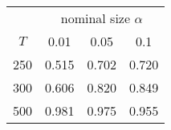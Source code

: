% 
\begin{tabular}{cccc}
  \hline
  & \multicolumn{3}{c}{nominal size $\alpha$} \\
 $T$ & 0.01 & 0.05 & 0.1 \\
 \hline
250 & 0.515 & 0.702 & 0.720 \\ 
  300 & 0.606 & 0.820 & 0.849 \\ 
  500 & 0.981 & 0.975 & 0.955 \\ 
   \hline
\end{tabular}
